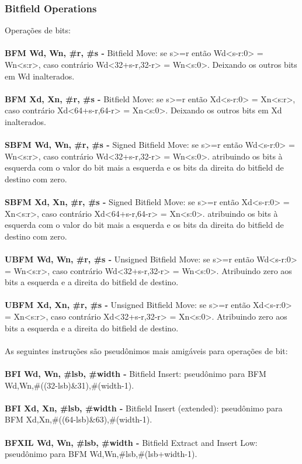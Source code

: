 \documentclass[12pt,a4paper,utf8]{ppgsi}
\begin{document}
\subsubsection{Bitfield Operations}
Operações de bits:
\\\\\textbf{BFM Wd, Wn, \#r, \#s -} Bitfield Move: se s>=r então Wd<s-r:0> = Wn<s:r>, caso contrário Wd<32+s-r,32-r> = Wn<s:0>. Deixando os outros bits em Wd inalterados.
\\\\\textbf{BFM Xd, Xn, \#r, \#s -} Bitfield Move: se s>=r então Xd<s-r:0> = Xn<s:r>, caso contrário Xd<64+s-r,64-r> = Xn<s:0>. Deixando os outros bits em Xd inalterados.
\\\\\textbf{SBFM Wd, Wn, \#r, \#s -} Signed Bitfield Move: se s>=r então Wd<s-r:0> = Wn<s:r>, caso contrário Wd<32+s-r,32-r> = Wn<s:0>.
atribuindo os bits à esquerda com o valor do bit mais a esquerda e os bits da direita do bitfield de destino com zero.
\\\\\textbf{SBFM Xd, Xn, \#r, \#s -} Signed Bitfield Move: se s>=r então Xd<s-r:0> = Xn<s:r>, caso contrário Xd<64+s-r,64-r> = Xn<s:0>.
atribuindo os bits à esquerda com o valor do bit mais a esquerda e os bits da direita do bitfield de destino com zero.
\\\\\textbf{UBFM Wd, Wn, \#r, \#s -} Unsigned Bitfield Move: se s>=r então Wd<s-r:0> = Wn<s:r>, caso contrário Wd<32+s-r,32-r> = Wn<s:0>.
Atribuindo zero aos bits a esquerda e a direita do bitfield de destino.
\\\\\textbf{UBFM Xd, Xn, \#r, \#s -} Unsigned Bitfield Move: se s>=r então Xd<s-r:0> = Xn<s:r>, caso contrário Xd<32+s-r,32-r> = Xn<s:0>.
Atribuindo zero aos bits a esquerda e a direita do bitfield de destino.
\\\\As seguintes instruções são pseudônimos mais amigáveis para operações de bit:
\\\\\textbf{BFI Wd, Wn, \#lsb, \#width -} Bitfield Insert: pseudônimo para BFM Wd,Wn,\#((32-lsb)\&31),\#(width-1).
\\\\\textbf{BFI Xd, Xn, \#lsb, \#width -} Bitfield Insert (extended): pseudônimo para BFM Xd,Xn,\#((64-lsb)\&63),\#(width-1).
\\\\\textbf{BFXIL Wd, Wn, \#lsb, \#width -} Bitfield Extract and Insert Low: pseudônimo para BFM Wd,Wn,\#lsb,\#(lsb+width-1).
\end{document}
